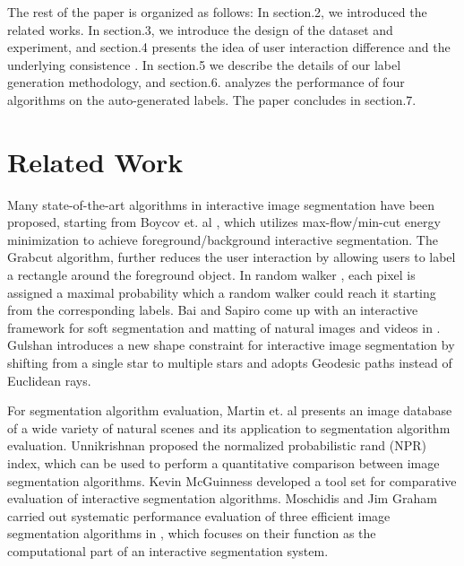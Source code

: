 \documentclass[runningheads,a4paper]{llncs}
\begin{document}
The rest of the paper is organized as follows: In section.2, we introduced the related works. In section.3, we introduce the design of the dataset and experiment, and section.4 presents the idea of user interaction difference and the underlying consistence . In section.5 we describe the details of our label generation methodology, and section.6. analyzes the performance of four algorithms on the auto-generated labels. The paper concludes in section.7.

\section{Related Work}

Many state-of-the-art algorithms in interactive image segmentation have been proposed, starting from Boycov et. al \cite{boykov2001interactive}, which utilizes max-flow/min-cut energy minimization to achieve foreground/background interactive segmentation. The Grabcut algorithm\cite{rother2004grabcut}, further reduces the user interaction by allowing users to label a rectangle around the foreground object. In random walker \cite{grady2006random}, each pixel is assigned a maximal probability which a random walker could reach it starting from the corresponding labels. Bai and Sapiro come up with an interactive framework for soft segmentation and matting of natural images and videos in \cite{bai2007geodesic}. Gulshan\cite{gulshan2010geodesic} introduces a new shape constraint for interactive image segmentation by shifting from a single star to multiple stars and adopts Geodesic paths instead of Euclidean rays.

For segmentation algorithm evaluation, Martin et. al  \cite{martin2001database} presents an image database of a wide variety of natural scenes and its application to segmentation algorithm evaluation.  Unnikrishnan \cite{unnikrishnan2007toward} proposed the normalized probabilistic rand (NPR) index, which can be used to perform a quantitative comparison between image segmentation algorithms. Kevin McGuinness \cite{mcguinness2010comparative} developed a tool set for comparative evaluation of interactive segmentation algorithms. Moschidis and Jim Graham carried out systematic performance evaluation of three efficient image segmentation algorithms in \cite{moschidis2010systematic}, which focuses on their function as the computational part of an interactive segmentation system.
\end{document}
